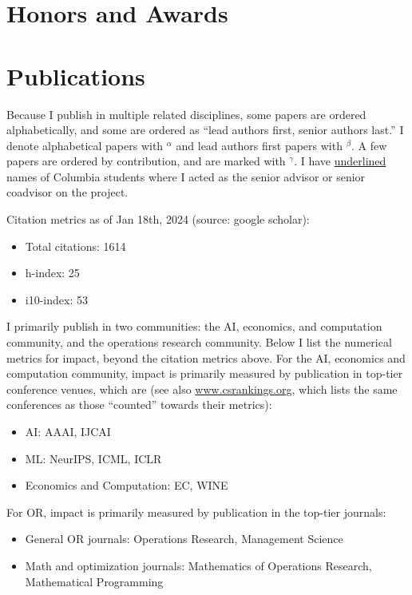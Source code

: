 \documentclass[11pt,a4paper,sans]{moderncv}        %
\newif\ifpromotion
\begin{document}
\section{Honors and Awards}


\section{Publications}
\ifpromotion
Because I publish in multiple related disciplines, some papers are ordered
alphabetically, and some are ordered as ``lead authors first, senior authors last.''
I denote alphabetical papers with $^\alpha$ and lead authors first papers with
$^\beta$.
A few papers are ordered by contribution, and are marked with $^\gamma$.
I have \underline{underlined} names of Columbia students where I acted as
the senior advisor or senior coadvisor on the project.

Citation metrics as of Jan 18th, 2024 (source: google scholar):
\begin{itemize}
\item Total citations: 1614
\item h-index: 25
\item i10-index: 53
\end{itemize}

I primarily publish in two communities: the AI, economics, and computation
community, and the operations research community.
Below I list the numerical metrics for impact, beyond the citation metrics above.
For the AI, economics and computation community, impact is primarily measured by publication in top-tier
conference venues, which are (see also \url{www.csrankings.org}, which lists the
same conferences as those ``counted'' towards their metrics):
\begin{itemize}
\item AI: AAAI, IJCAI
\item ML: NeurIPS, ICML, ICLR
\item Economics and Computation: EC, WINE
\end{itemize}
For OR, impact is primarily measured by publication in the top-tier journals:
\begin{itemize}
\item General OR journals: Operations Research, Management Science 
\item Math and optimization journals: Mathematics of Operations Research,
  Mathematical Programming
\end{itemize}
\end{document}
